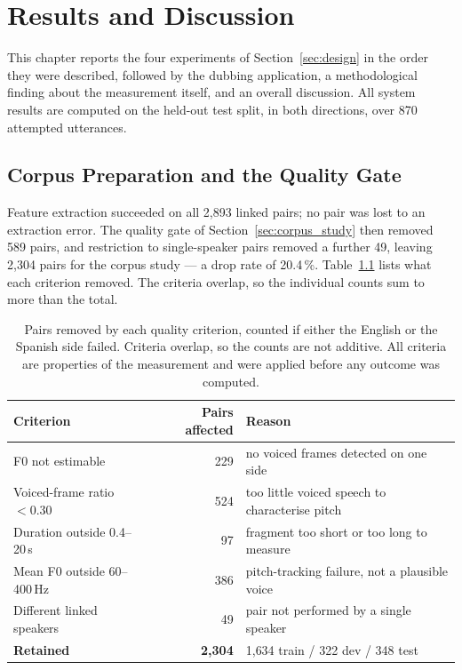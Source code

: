 %
\chapter{Results and Discussion}
\label{ch:results}

This chapter reports the four experiments of Section~\ref{sec:design} in the order they were
described, followed by the dubbing application, a methodological finding about the measurement
itself, and an overall discussion. All system results are computed on the held-out test split, in
both directions, over 870 attempted utterances.

\section{Corpus Preparation and the Quality Gate}
\label{sec:gate_result}

Feature extraction succeeded on all 2{,}893 linked pairs; no pair was lost to an extraction
error. The quality gate of Section~\ref{sec:corpus_study} then removed 589 pairs, and restriction
to single-speaker pairs removed a further 49, leaving 2{,}304 pairs for the corpus study --- a
drop rate of 20.4\,\%. Table~\ref{tab:gate} lists what each criterion removed. The criteria overlap,
so the individual counts sum to more than the total.

\begin{table}[htbp]
\caption{Pairs removed by each quality criterion, counted if either the English or the Spanish side
failed. Criteria overlap, so the counts are not additive. All criteria are properties of the
measurement and were applied before any outcome was computed.}
\label{tab:gate}
\centering
{\singlespacing\small
\begin{tabular}{@{}lrl@{}}
\toprule
\textbf{Criterion} & \textbf{Pairs affected} & \textbf{Reason} \\
\midrule
F0 not estimable            & 229 & no voiced frames detected on one side \\
Voiced-frame ratio $<0.30$  & 524 & too little voiced speech to characterise pitch \\
Duration outside 0.4--20\,s & 97  & fragment too short or too long to measure \\
Mean F0 outside 60--400\,Hz & 386 & pitch-tracking failure, not a plausible voice \\
\midrule
Different linked speakers   & 49  & pair not performed by a single speaker \\
\midrule
\textbf{Retained}           & \textbf{2{,}304} & 1{,}634 train / 322 dev / 348 test \\
\bottomrule
\end{tabular}\par}
\end{table}

